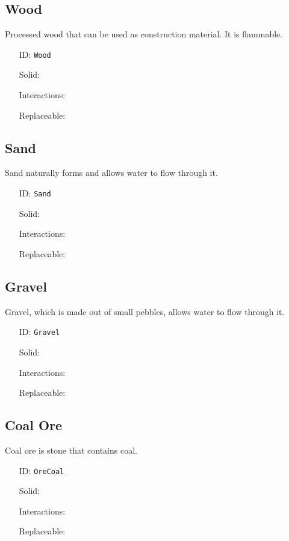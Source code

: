 \subsection{Wood}\label{subsec:blocks_wood}
Processed wood that can be used as construction material. It is flammable.
\newline
\begin{itemize}[nosep]
    \item[ID:] \texttt{Wood}
    \item[Solid:]  \Checkmark \item[Interactions:]  \XSolidBrush \item[Replaceable:]  \XSolidBrush
\end{itemize}

\subsection{Sand}\label{subsec:blocks_sand}
Sand naturally forms and allows water to flow through it.
\newline
\begin{itemize}[nosep]
    \item[ID:] \texttt{Sand}
    \item[Solid:]  \Checkmark \item[Interactions:]  \XSolidBrush \item[Replaceable:]  \XSolidBrush
\end{itemize}

\subsection{Gravel}\label{subsec:blocks_gravel}
Gravel, which is made out of small pebbles, allows water to flow through it.
\newline
\begin{itemize}[nosep]
    \item[ID:] \texttt{Gravel}
    \item[Solid:]  \Checkmark \item[Interactions:]  \XSolidBrush \item[Replaceable:]  \XSolidBrush
\end{itemize}

\subsection{Coal Ore}\label{subsec:blocks_coal ore}
Coal ore is stone that contains coal.
\newline
\begin{itemize}[nosep]
    \item[ID:] \texttt{OreCoal}
    \item[Solid:]  \Checkmark \item[Interactions:]  \XSolidBrush \item[Replaceable:]  \XSolidBrush
\end{itemize}


